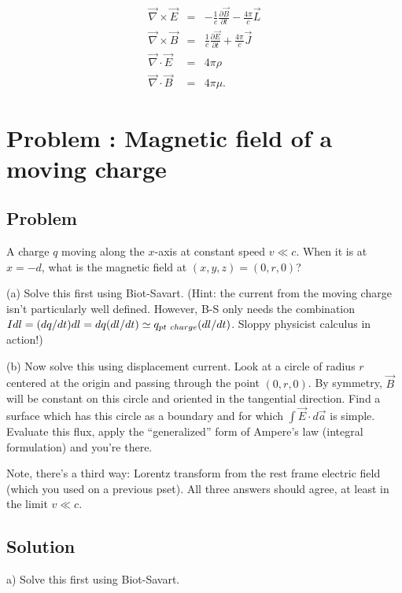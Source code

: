 \documentclass[solutions]{esg8022pset}
\begin{document}
\begin{eqnarray}
\vec{\nabla}\times\vec{E} &=& -\frac{1}{c}\frac{\partial
\vec{B}}{\partial t}-\frac{4\pi}{c}\vec{L}\\
\vec{\nabla}\times\vec{B} &=& \frac{1}{c}\frac{\partial
\vec{E}}{\partial t}+\frac{4\pi}{c}\vec{J}\\
\vec{\nabla}\cdot\vec{E} &=& 4\pi\rho\\
\vec{\nabla}\cdot\vec{B} &=& 4\pi\mu.
\end{eqnarray}




\section{Problem \thesection:  Magnetic field of a moving charge}
\subsection{Problem}
A charge $q$ moving
along the $x$-axis at constant speed $v \ll c$.  When it is at $x =
-d$, what is the magnetic field at $(x,y,z) = (0,r,0)$?

\par\noindent (a)  Solve this first using Biot-Savart.  (Hint:
the current from the moving charge isn't particularly well defined.
However, B-S only needs the combination $I dl = (dq/dt) dl = dq
(dl/dt) \simeq q_{\rm pt\ charge}(dl/dt)$.  Sloppy physicist calculus
in action!)

\par\noindent (b)  Now solve this using displacement current.
Look at a circle of radius $r$ centered at the origin and passing
through the point $(0,r,0)$.  By symmetry, $\vec B$ will be constant
on this circle and oriented in the tangential direction.  Find a
surface which has this circle as a boundary and for which $\int \vec
E\cdot d\vec a$ is simple.  Evaluate this flux, apply the
``generalized'' form of Ampere's law (integral formulation) and you're
there.

\par\noindent Note, there's a third way: Lorentz transform from the
rest frame electric field (which you used on a previous pset).  All
three answers should agree, at least in the limit $v \ll c$.

\subsection{Solution}
a) Solve this first using Biot-Savart.\\
\end{document}
